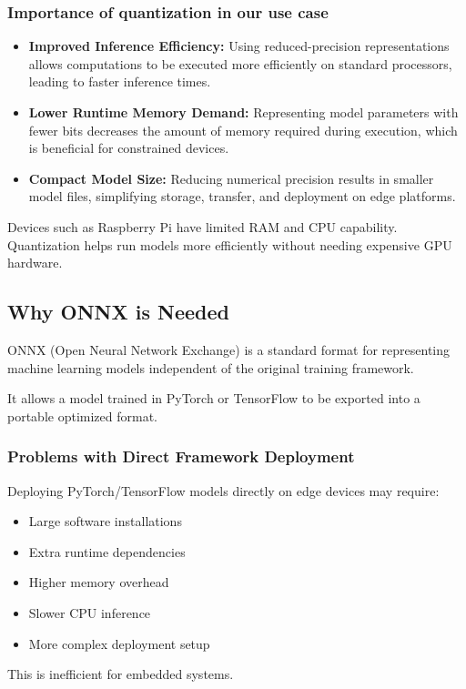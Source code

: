 \subsubsection{Importance of quantization in our use case}
\begin{itemize}
\item \textbf{Improved Inference Efficiency:} Using reduced-precision representations allows computations to be executed more efficiently on standard processors, leading to faster inference times.
\item \textbf{Lower Runtime Memory Demand:} Representing model parameters with fewer bits decreases the amount of memory required during execution, which is beneficial for constrained devices.
\item \textbf{Compact Model Size:} Reducing numerical precision results in smaller model files, simplifying storage, transfer, and deployment on edge platforms.
\end{itemize}


Devices such as Raspberry Pi have limited RAM and CPU capability. Quantization helps run models more efficiently without needing expensive GPU hardware.

\subsection{Why ONNX is Needed}
ONNX (Open Neural Network Exchange) is a standard format for representing machine learning models independent of the original training framework.

It allows a model trained in PyTorch or TensorFlow to be exported into a portable optimized format.

\subsubsection{Problems with Direct Framework Deployment}
Deploying PyTorch/TensorFlow models directly on edge devices may require:
\begin{itemize}
\item Large software installations
\item Extra runtime dependencies
\item Higher memory overhead
\item Slower CPU inference
\item More complex deployment setup
\end{itemize}
This is inefficient for embedded systems.

